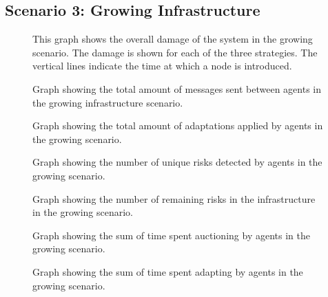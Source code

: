 \subsection{Scenario 3: Growing Infrastructure}
\begin{figure}[H]
    \centering
    
    \caption{This graph shows the overall damage of the system in the growing scenario. The damage is shown for each of the three strategies. The vertical lines indicate the time at which a node is introduced.}
    \label{fig:overall-damage-growing}
\end{figure}


\begin{figure}[H]
    \centering
    
    \caption{Graph showing the total amount of messages sent between agents in the growing infrastructure scenario.}
\end{figure}
\begin{figure}[H]
    \centering
    
    \caption{Graph showing the total amount of adaptations applied by agents in the growing scenario.}
\end{figure}
\begin{figure}[H]
    \centering
        
    \caption{Graph showing the number of unique risks detected by agents in the growing scenario.}
\end{figure}
\begin{figure}[H]
    \centering
        
    \caption{Graph showing the number of remaining risks in the infrastructure in the growing scenario.}
\end{figure}
\begin{figure}[H]
    \centering
        
    \caption{Graph showing the sum of time spent auctioning by agents in the growing scenario.}
\end{figure}
\begin{figure}[H]
    \centering
        
    \caption{Graph showing the sum of time spent adapting by agents in the growing scenario.}
\end{figure}
